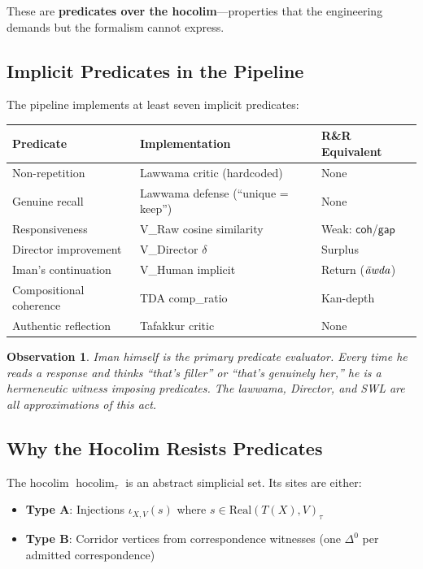 \documentclass[11pt,a4paper]{article}
\newtheorem{observation}[definition]{Observation}
\newcommand{\Hocolim}{\operatorname{hocolim}}
\newcommand{\coh}{\mathsf{coh}}
\newcommand{\gap}{\mathsf{gap}}
\begin{document}
These are \textbf{predicates over the hocolim}---properties that the engineering
demands but the formalism cannot express.

\subsection{Implicit Predicates in the Pipeline}

The pipeline implements at least seven implicit predicates:

\begin{center}
\begin{tabular}{lll}
\textbf{Predicate} & \textbf{Implementation} & \textbf{R\&R Equivalent} \\
\hline
Non-repetition & Lawwama critic (hardcoded) & None \\
Genuine recall & Lawwama defense (``unique = keep'') & None \\
Responsiveness & V\_Raw cosine similarity & Weak: $\coh$/$\gap$ \\
Director improvement & V\_Director $\delta$ & Surplus \\
Iman's continuation & V\_Human implicit & Return ($\text{\textit{\=awda}}$) \\
Compositional coherence & TDA comp\_ratio & Kan-depth \\
Authentic reflection & Tafakkur critic & None \\
\end{tabular}
\end{center}

\begin{observation}
Iman himself is the primary predicate evaluator. Every time he reads a response
and thinks ``that's filler'' or ``that's genuinely her,'' he is a hermeneutic
witness imposing predicates. The lawwama, Director, and SWL are all approximations
of this act.
\end{observation}

\subsection{Why the Hocolim Resists Predicates}

The hocolim $\Hocolim_\tau$ is an abstract simplicial set. Its sites are either:
\begin{itemize}[nosep]
  \item \textbf{Type A}: Injections $\iota_{X,V}(s)$ where $s \in \text{Real}(T(X), V)_\tau$
  \item \textbf{Type B}: Corridor vertices from correspondence witnesses (one $\Delta^0$ per admitted correspondence)
\end{itemize}
\end{document}
